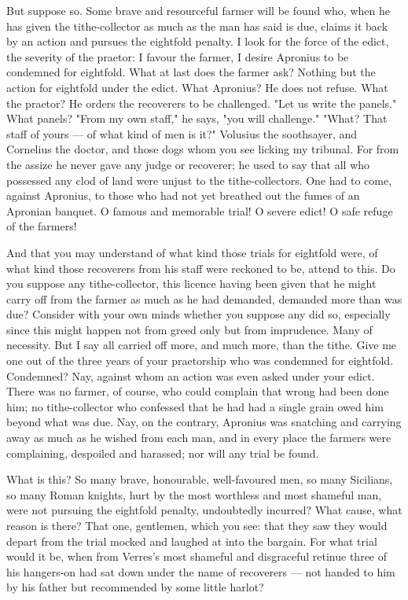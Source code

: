  But suppose so. Some brave and resourceful farmer will be found who, when he has given the tithe-collector as much as the man has said is due, claims it back by an action and pursues the eightfold penalty. I look for the force of the edict, the severity of the praetor: I favour the farmer, I desire Apronius to be condemned for eightfold. What at last does the farmer ask? Nothing but the action for eightfold under the edict. What Apronius? He does not refuse. What the praetor? He orders the recoverers to be challenged. "Let us write the panels." What panels? "From my own staff," he says, "you will challenge." "What? That staff of yours --- of what kind of men is it?" Volusius the soothsayer, and Cornelius the doctor, and those dogs whom you see licking my tribunal. For from the assize he never gave any judge or recoverer; he used to say that all who possessed any clod of land were unjust to the tithe-collectors. One had to come, against Apronius, to those who had not yet breathed out the fumes of an Apronian banquet. O famous and memorable trial! O severe edict! O safe refuge of the farmers!

 And that you may understand of what kind those trials for eightfold were, of what kind those recoverers from his staff were reckoned to be, attend to this. Do you suppose any tithe-collector, this licence having been given that he might carry off from the farmer as much as he had demanded, demanded more than was due? Consider with your own minds whether you suppose any did so, especially since this might happen not from greed only but from imprudence. Many of necessity. But I say all carried off more, and much more, than the tithe. Give me one out of the three years of your praetorship who was condemned for eightfold. Condemned? Nay, against whom an action was even asked under your edict. There was no farmer, of course, who could complain that wrong had been done him; no tithe-collector who confessed that he had had a single grain owed him beyond what was due. Nay, on the contrary, Apronius was snatching and carrying away as much as he wished from each man, and in every place the farmers were complaining, despoiled and harassed; nor will any trial be found.

 What is this? So many brave, honourable, well-favoured men, so many Sicilians, so many Roman knights, hurt by the most worthless and most shameful man, were not pursuing the eightfold penalty, undoubtedly incurred? What cause, what reason is there? That one, gentlemen, which you see: that they saw they would depart from the trial mocked and laughed at into the bargain. For what trial would it be, when from Verres's most shameful and disgraceful retinue three of his hangers-on had sat down under the name of recoverers --- not handed to him by his father but recommended by some little harlot?

